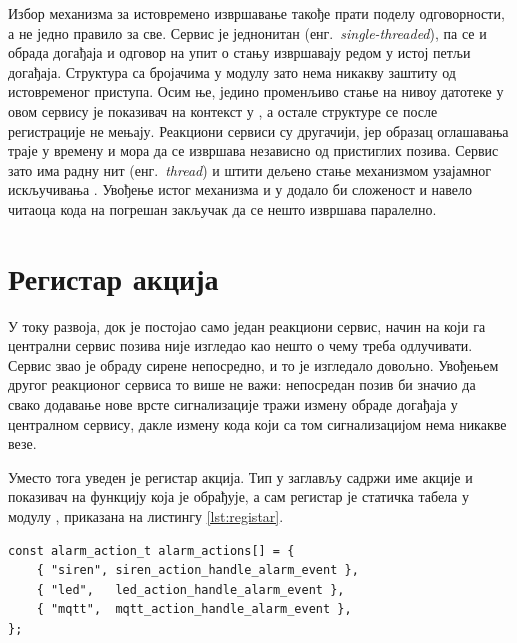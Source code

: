 \documentclass[12pt,oneside]{memoir}
\begin{document}
Избор механизма за истовремено извршавање такође прати поделу одговорности, а не једно
правило за све. Сервис  је једнонитан (енг.\ \textit{single-threaded}),
па се и обрада догађаја и
одговор на упит о стању извршавају редом у истој петљи догађаја. Структура са
бројачима  у модулу  зато нема никакву заштиту од
истовременог приступа. Осим ње, једино променљиво стање на нивоу датотеке у овом сервису је
показивач  на  контекст у , а остале структуре се
после регистрације не мењају. Реакциони сервиси су другачији, јер образац оглашавања траје
у времену и мора да се извршава независно од пристиглих позива. Сервис
 зато има радну нит (енг.\ \textit{thread}) и штити дељено стање механизмом узајамног
искључивања . Увођење истог механизма и у  додало
би сложеност и навело читаоца кода на погрешан закључак да се нешто извршава паралелно.

\section{Регистар акција}
\label{sec:registar}

У току развоја, док је постојао само један реакциони сервис, начин на који га централни 
сервис позива није изгледао као нешто о чему треба одлучивати. Сервис  звао је обраду сирене
непосредно, и то је изгледало довољно. Увођењем другог реакционог сервиса то више не важи:
непосредан позив би значио да свако додавање нове врсте сигнализације тражи измену обраде
догађаја у централном сервису, дакле измену кода који са том сигнализацијом нема никакве
везе.

Уместо тога уведен је регистар акција. Тип  у заглављу
 садржи име акције и показивач на функцију која је обрађује, а сам
регистар је статичка табела  у модулу , приказана
на листингу \ref{lst:registar}.

\begin{lstlisting}[caption={Регистар акција са три уписане реакције},label={lst:registar}]
const alarm_action_t alarm_actions[] = {
    { "siren", siren_action_handle_alarm_event },
    { "led",   led_action_handle_alarm_event },
    { "mqtt",  mqtt_action_handle_alarm_event },
};
\end{lstlisting}
\end{document}
